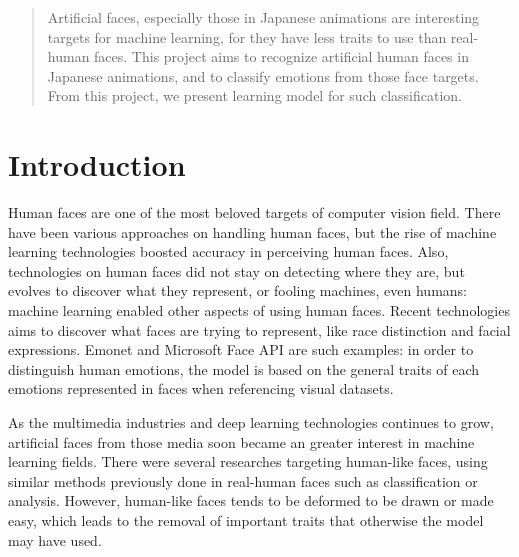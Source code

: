 \documentclass{article}
\begin{document}


\begin{abstract}

Artificial faces, especially those in Japanese animations are interesting targets for machine learning, for they have less traits to use than real-human faces. This project aims to recognize artificial human faces in Japanese animations, and to classify emotions from those face targets. From this project, we present learning model for such classification.

\end{abstract}


\section{Introduction}
\label{introduction}

Human faces are one of the most beloved targets of computer vision field.
There have been various approaches on handling human faces, but the rise of machine learning technologies boosted accuracy in perceiving human faces. \cite{sun2018face}
Also, technologies on human faces did not stay on detecting where they are, but evolves to discover what they represent, or fooling machines, even humans: machine learning enabled other aspects of using human faces.
Recent technologies aims to discover what faces are trying to represent, like race distinction\cite{vo2018race} and facial expressions.
Emonet and Microsoft Face API are such examples: in order to distinguish human emotions, the model is based on the general traits of each emotions represented in faces when referencing visual datasets\cite{DBLP:journals/corr/KahouBLGMKJFDBF15}.

As the multimedia industries and deep learning technologies continues to grow, artificial faces from those media soon became an greater interest in machine learning fields. There were several researches targeting human-like faces, using similar methods previously done in real-human faces such as classification or analysis\cite{鄭光宇2018}.
However, human-like faces tends to be deformed to be drawn or made easy, which leads to the removal of important traits that otherwise the model may have used.
\end{document}
